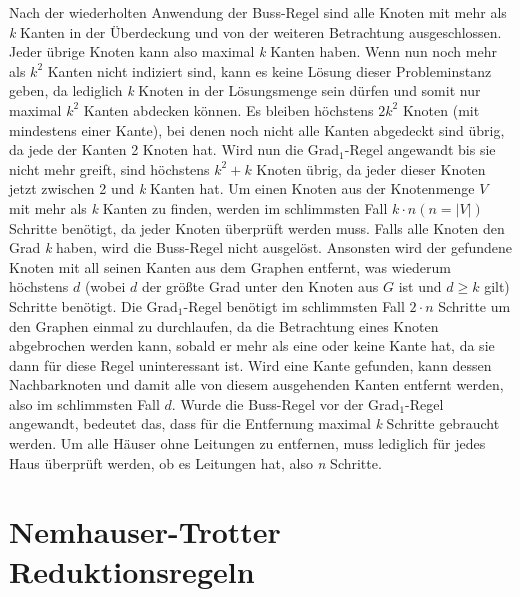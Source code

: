 Nach der wiederholten Anwendung der Buss-Regel sind alle Knoten mit mehr als \emph{k} Kanten in der Überdeckung und von der weiteren Betrachtung ausgeschlossen. Jeder übrige Knoten kann also maximal \emph{k} Kanten haben. Wenn nun noch mehr als $k^{2}$ Kanten nicht indiziert sind, kann es keine Lösung dieser Probleminstanz geben, da lediglich \emph{k} Knoten in der Lösungsmenge sein dürfen und somit nur maximal $k^{2}$ Kanten  abdecken können. Es bleiben höchstens $2 k^{2}$ Knoten (mit mindestens einer Kante), bei denen noch nicht alle Kanten abgedeckt sind übrig\cite{param}, da jede der Kanten 2 Knoten hat. Wird nun die Grad$_{1}$-Regel angewandt bis sie nicht mehr greift, sind höchstens $k^{2} + k$ Knoten übrig, da jeder dieser Knoten jetzt zwischen 2 und \emph{k} Kanten hat.
Um einen Knoten aus der Knotenmenge $V$ mit mehr als \emph{k} Kanten zu finden, werden im schlimmsten Fall $k \cdot n (n=|V|)$ Schritte benötigt, da jeder Knoten überprüft werden muss. Falls alle Knoten den Grad \emph{k} haben, wird die Buss-Regel nicht ausgelöst. Ansonsten wird der gefundene Knoten mit all seinen Kanten aus dem Graphen entfernt, was wiederum höchstens $d$ (wobei $d$ der größte Grad unter den Knoten aus $G$ ist und $d \geq k$ gilt) Schritte benötigt. Die Grad$_{1}$-Regel benötigt im schlimmsten Fall $2 \cdot n$ Schritte um den Graphen einmal zu durchlaufen, da die Betrachtung eines Knoten abgebrochen werden kann, sobald er mehr als eine oder keine Kante hat, da sie dann für diese Regel uninteressant ist. Wird eine Kante gefunden, kann dessen Nachbarknoten und damit alle von diesem ausgehenden Kanten entfernt werden, also im schlimmsten Fall $d$. Wurde die Buss-Regel vor der Grad$_{1}$-Regel angewandt, bedeutet das, dass für die Entfernung maximal \emph{k} Schritte gebraucht werden. Um alle Häuser ohne Leitungen zu entfernen, muss lediglich für jedes Haus überprüft werden, ob es Leitungen hat, also \emph{n} Schritte.

\section{Nemhauser-Trotter Reduktionsregeln}
\label{ch:Grundlagen:sec:Nemhauser-Trotter Reduktionsregeln}

